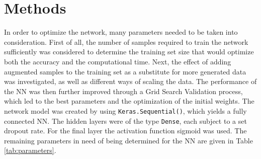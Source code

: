 \documentclass[prl,twocolumn]{revtex4-1}
\begin{document}

\section{Methods}
In order to optimize the network, many parameters needed to be taken into consideration. First of all, the number of samples required to train the network sufficiently was considered to determine the training set size that would optimize both the accuracy and the computational time. Next, the effect of adding augmented samples to the training set as a substitute for more generated data was investigated, as well as different ways of scaling the data. The performance of the NN was then further improved through a Grid Search Validation process, which led to the best parameters and the optimization of the initial weights.
\vskip 4pt
The network model was created by using \texttt{Keras.Sequential()}, which yields a fully connected NN. The hidden layers were of the type \texttt{Dense}, each subject to a set dropout rate. For the final layer the activation function sigmoid was used. The remaining parameters in need of being determined for the NN are given in Table \ref{tab:parameters}.
\end{document}
